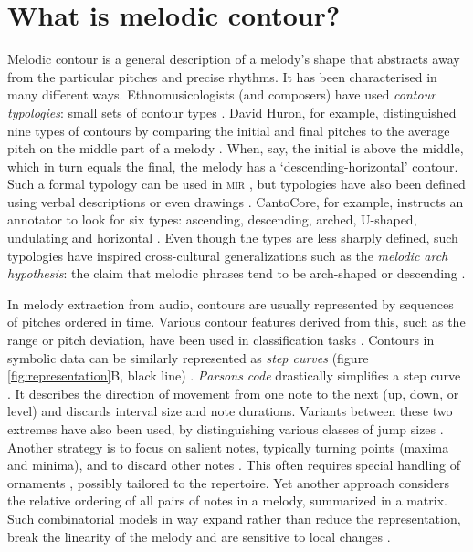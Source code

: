 \documentclass{article}
\begin{document}
\section{What is melodic contour?}


Melodic contour is a general description of a melody's shape that abstracts away from the particular pitches and precise rhythms.
It has been characterised in many different ways.
Ethnomusicologists (and composers) have used \emph{contour typologies}: small sets of contour types \cite{Adams1976}.
David Huron, for example, distinguished nine types of contours by comparing the initial and final pitches to the average pitch on the middle part of a melody \cite{Huron1996}.
When, say, the initial is above the middle, which in turn equals the final, the melody has a `descending-horizontal' contour.
Such a formal typology can be used in \textsc{mir} \cite{Mullensiefen2009}, but typologies have also been defined using verbal descriptions or even drawings \cite{Adams1976,Kelkar2018}.
CantoCore, for example, instructs an annotator to look for six types: ascending, descending, arched, U-shaped, undulating and horizontal \cite{Savage2012}.
Even though the types are less sharply defined, such typologies have inspired cross-cultural generalizations such as the \emph{melodic arch hypothesis}: the claim that melodic phrases tend to be arch-shaped or descending \cite{Huron1996,Savage2015,Tierney2011,Savage2017a}.


In melody extraction from audio, contours are usually represented by sequences of pitches ordered in time.
Various contour features derived from this, such as the range or pitch deviation, have been used in classification tasks \cite{Bittner2017,Panteli2017a,Bittner2015,Salamon2012}.
Contours in symbolic data can be similarly represented as \emph{step curves} (figure \ref{fig:representation}B, black line) \cite{Steinbeck1982,Mullensiefen2012}.
\emph{Parsons code} drastically simplifies a step curve \cite{Parsons1975}.
It describes the direction of movement from one note to the next (up, down, or level) and discards interval size and note durations.
Variants between these two extremes have also been used, by distinguishing various classes of jump sizes \cite{Mullensiefen2004b}.
Another strategy is to focus on salient notes, typically turning points (maxima and minima), and to discard other notes \cite{Adams1976,Steinbeck1982,Salamon2012}.
This often requires special handling of ornaments \cite{Mullensiefen2012}, possibly tailored to the repertoire.
Yet another approach considers the relative ordering of all pairs of notes in a melody, summarized in a matrix.
Such combinatorial models in way expand rather than reduce the representation, break the linearity of the melody and are sensitive to local changes \cite{Mullensiefen2012}.
\end{document}
